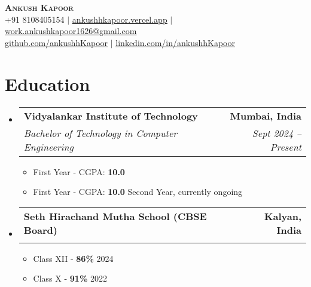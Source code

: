\documentclass[letterpaper,11pt]{article}
\makeatletter
\newcommand{\resumeItem}[1]{
  \item\small{
    {#1 \vspace{-2pt}}
  }
}
\newcommand{\resumeSubheading}[4]{
  \vspace{-2pt}\item
    \begin{tabular*}{1.0\textwidth}[t]{l@{\extracolsep{\fill}}r}
      \vspace{-2pt}\textbf{#1} & \textbf{\small #2} \\
      \textit{\small#3} & \textit{\small #4} \\
    \end{tabular*}\vspace{-7pt}
}
\newcommand{\resumeSubHeadingListStart}{\begin{itemize}[leftmargin=0.0in, label={}]}
\newcommand{\resumeSubHeadingListEnd}{\end{itemize}}
\newcommand{\resumeItemListStart}{\begin{itemize}}
\newcommand{\resumeItemListEnd}{\end{itemize}\vspace{-5pt}}
\makeatother
\begin{document}

\begin{center}
    {\huge \scshape \textbf{Ankush Kapoor}} \\ \vspace{5pt}
    \small
    +91 8108405154 $|$  \href{https://ankushhkapoor.vercel.app}{\underline{ankushhkapoor.vercel.app}} $|$
    \href{mailto:work.ankushkapoor1626@gmail.com}{\underline{work.ankushkapoor1626@gmail.com}} \\
    \href{https://github.com/ankushhKapoor}{\underline{github.com/ankushhKapoor}} $|$
    \href{https://linkedin.com/in/ankushhKapoor}{\underline{linkedin.com/in/ankushhKapoor}}    \vspace{-8pt}
\end{center}


\section{Education}
    \resumeSubHeadingListStart
        \resumeSubheading
            {Vidyalankar Institute of Technology}{Mumbai, India}
            {Bachelor of Technology in Computer Engineering}{Sept 2024 -- Present}
            \resumeItemListStart
                \resumeItem{First Year - CGPA: \textbf{10.0}}
                \resumeItem{First Year - CGPA: \textbf{10.0} \hspace{3.984in} Second Year, currently ongoing}
            \resumeItemListEnd

        \resumeSubheading
            {Seth Hirachand Mutha School (CBSE Board)}{Kalyan, India}
            {}{}
            \vspace{-16pt}\resumeItemListStart
                \resumeItem{Class XII - \textbf{86\%} \hspace{5.984in} 2024}
                \resumeItem{Class X - \textbf{91\%} \hspace{6.083in} 2022}
            \resumeItemListEnd
    \resumeSubHeadingListEnd
\vspace{-15pt}
\end{document}
